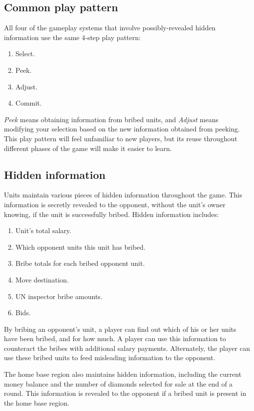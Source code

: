 \documentclass[12pt]{article}
\begin{document}
\subsection{Common play pattern}
All four of the gameplay systems that involve possibly-revealed hidden information use the same 4-step play pattern:
\begin{enumerate}
\item Select.
\item Peek.
\item Adjust.
\item Commit.
\end{enumerate}
{\it Peek} means obtaining information from bribed units, and {\it Adjust} means modifying your selection based on the new information obtained from peeking.  This play pattern will feel unfamiliar to new players, but its reuse throughout different phases of the game will make it easier to learn.

\subsection{Hidden information}
Units maintain various pieces of hidden information throughout the game.  This information is secretly revealed to the opponent, without the unit's owner knowing, if the unit is successfully bribed.  Hidden information includes:
\begin{enumerate}
\item Unit's total salary.
\item Which opponent units this unit has bribed.
\item Bribe totals for each bribed opponent unit.
\item Move destination.
\item UN inspector bribe amounts.
\item Bids.
\end{enumerate}
By bribing an opponent's unit, a player can find out which of his or her units have been bribed, and for how much.  A player can use this information to counteract the bribes with additional salary payments.  Alternately, the player can use these bribed units to feed misleading information to the opponent.

The home base region also maintains hidden information, including the current money balance and the number of diamonds selected for sale at the end of a round.  This information is revealed to the opponent if a bribed unit is present in the home base region.
\end{document}
